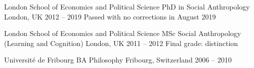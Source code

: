 

\begin{cventries}

  \cventry
    {London School of Economics and Political Science} %
    {PhD in Social Anthropology} %
    {London, UK} %
    {2012 -- 2019} %
    {Passed with no corrections in August 2019}

  \cventry
    {London School of Economics and Political Science} %
    {MSc Social Anthropology (Learning and Cognition)} %
    {London, UK} %
    {2011 -- 2012} %
    {Final grade: distinction}

  \cventry
    {Université de Fribourg} %
    {BA Philosophy} %
    {Fribourg, Switzerland} %
    {2006 -- 2010} %
    {}

\end{cventries}

